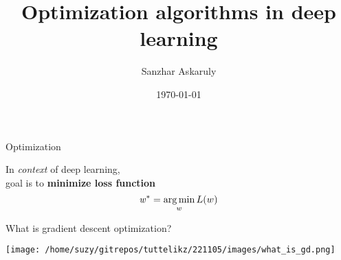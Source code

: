 
\title[CodeSeoul] %
	{Optimization algorithms in deep learning}

\author[AI *** Research Paper Review] %
	{Sanzhar Askaruly}


\date{\today} 


    \begin{frame}
    \titlepage %
    \end{frame}


    \begin{frame}{Optimization}
      \begin{center}
        \begin{huge}
          In \textit{context} of deep learning, \\
          goal is to \textbf{minimize loss function}
          \vspace{0.2cm}
          \begin{equation}
            \mathit{w}^* = \operatorname*{arg\,min}_{w}L(w)
          \end{equation}
        \end{huge}
      \end{center}
    \end{frame}

    \begin{frame}{What is gradient descent optimization?}
      \begin{center}
          \texttt{[image: /home/suzy/gitrepos/tuttelikz/221105/images/what\_is\_gd.png]}
      \end{center}
    \end{frame}

